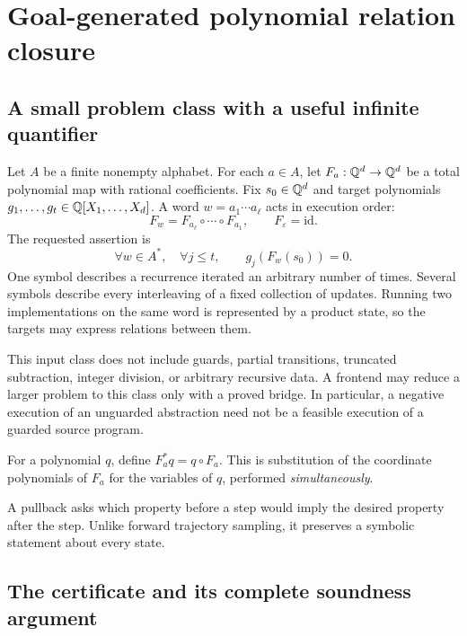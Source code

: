 \section{Goal-generated polynomial relation closure}
\label{sec:vector}

\subsection{A small problem class with a useful infinite quantifier}

Let $A$ be a finite nonempty alphabet. For each $a\in A$, let $F_a:\mathbb Q^d\to\mathbb Q^d$ be a total polynomial map with rational coefficients. Fix $s_0\in\mathbb Q^d$ and target polynomials $g_1,\ldots,g_t\in\mathbb Q[X_1,\ldots,X_d]$. A word $w=a_1\cdots a_\ell$ acts in execution order:
\[
 F_w=F_{a_\ell}\circ\cdots\circ F_{a_1},\qquad F_\varepsilon=\mathrm{id}.
\]
The requested assertion is
\begin{equation}
 \forall w\in A^*,\quad \forall j\le t,\qquad g_j(F_w(s_0))=0.
 \label{eq:allwords}
\end{equation}
One symbol describes a recurrence iterated an arbitrary number of times. Several symbols describe every interleaving of a fixed collection of updates. Running two implementations on the same word is represented by a product state, so the targets may express relations between them.

This input class does not include guards, partial transitions, truncated subtraction, integer division, or arbitrary recursive data. A frontend may reduce a larger problem to this class only with a proved bridge. In particular, a negative execution of an unguarded abstraction need not be a feasible execution of a guarded source program.

\begin{definition}[Pullback]
For a polynomial $q$, define $F_a^*q=q\circ F_a$. This is substitution of the coordinate polynomials of $F_a$ for the variables of $q$, performed \emph{simultaneously}.
\end{definition}
A pullback asks which property before a step would imply the desired property after the step. Unlike forward trajectory sampling, it preserves a symbolic statement about every state.

\subsection{The certificate and its complete soundness argument}


